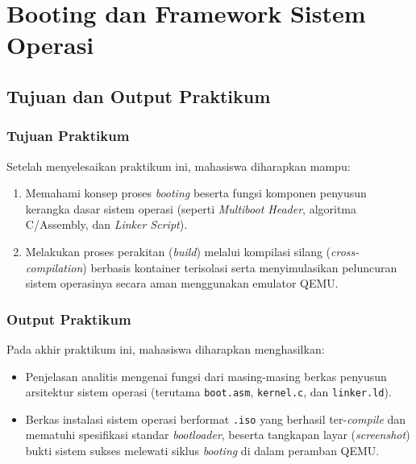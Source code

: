 
\chapter{Booting dan Framework Sistem Operasi}
\label{chap:modul-07}

\section{Tujuan dan Output Praktikum}

\subsection{Tujuan Praktikum}
Setelah menyelesaikan praktikum ini, mahasiswa diharapkan mampu:
\begin{enumerate}
    \item Memahami konsep proses \textit{booting} beserta fungsi komponen penyusun kerangka dasar sistem operasi (seperti \textit{Multiboot Header}, algoritma C/Assembly, dan \textit{Linker Script}).
    \item Melakukan proses perakitan (\textit{build}) melalui kompilasi silang (\textit{cross-compilation}) berbasis kontainer terisolasi serta menyimulasikan peluncuran sistem operasinya secara aman menggunakan emulator QEMU.
\end{enumerate}

\subsection{Output Praktikum}
Pada akhir praktikum ini, mahasiswa diharapkan menghasilkan:
\begin{itemize}
    \item Penjelasan analitis mengenai fungsi dari masing-masing berkas penyusun arsitektur sistem operasi (terutama \texttt{boot.asm}, \texttt{kernel.c}, dan \texttt{linker.ld}).
    \item Berkas instalasi sistem operasi berformat \texttt{.iso} yang berhasil ter-\textit{compile} dan mematuhi spesifikasi standar \textit{bootloader}, beserta tangkapan layar (\textit{screenshot}) bukti sistem sukses melewati siklus \textit{booting} di dalam peramban QEMU.
\end{itemize}

